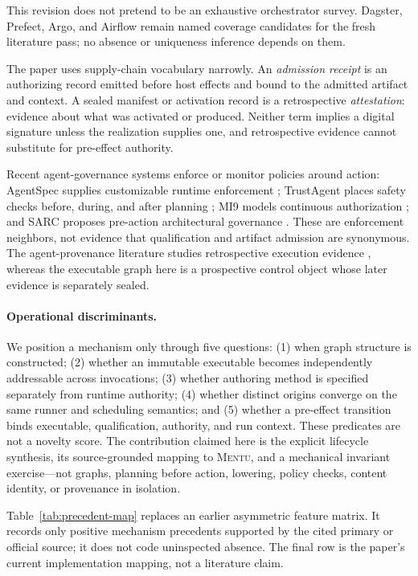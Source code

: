 \documentclass[11pt]{article}
\newcommand{\mentu}{\textsc{Mentu}}
\begin{document}
This revision does not pretend to be an exhaustive orchestrator survey.
Dagster, Prefect, Argo, and Airflow remain named coverage candidates for the
fresh literature pass; no absence or uniqueness inference depends on them.

The paper uses supply-chain vocabulary narrowly. An \emph{admission receipt}
is an authorizing record emitted before host effects and bound to the admitted
artifact and context. A sealed manifest or activation record is a
retrospective \emph{attestation}: evidence about what was activated or
produced. Neither term implies a digital signature unless the realization
supplies one, and retrospective evidence cannot substitute for pre-effect
authority.

Recent agent-governance systems enforce or monitor policies around action:
AgentSpec supplies customizable runtime enforcement
\cite{Wang2026AgentSpecRuntime}; TrustAgent places safety checks before, during,
and after planning \cite{Hua2024TrustAgent}; MI9 models continuous authorization
\cite{Wang2025MI9}; and SARC proposes pre-action architectural governance
\cite{Besanson2026SARC}. These are enforcement neighbors, not evidence that
qualification and artifact admission are synonymous. The agent-provenance
literature studies retrospective execution evidence
\cite{Wang2026AgentTraces}, whereas the executable graph here is a prospective
control object whose later evidence is separately sealed.

\paragraph{Operational discriminants.}
We position a mechanism only through five questions: (1) when graph structure
is constructed; (2) whether an immutable executable becomes independently
addressable across invocations; (3) whether authoring method is specified
separately from runtime authority; (4) whether distinct origins converge on the
same runner and scheduling semantics; and (5) whether a pre-effect transition
binds executable, qualification, authority, and run context.  These predicates
are not a novelty score. The contribution claimed here is the explicit
lifecycle synthesis, its source-grounded mapping to \mentu{}, and a mechanical
invariant exercise---not graphs, planning before action, lowering, policy
checks, content identity, or provenance in isolation.

Table~\ref{tab:precedent-map} replaces an earlier asymmetric feature matrix.
It records only positive mechanism precedents supported by the cited primary
or official source; it does not code uninspected absence. The final row is the
paper's current implementation mapping, not a literature claim.
\end{document}

